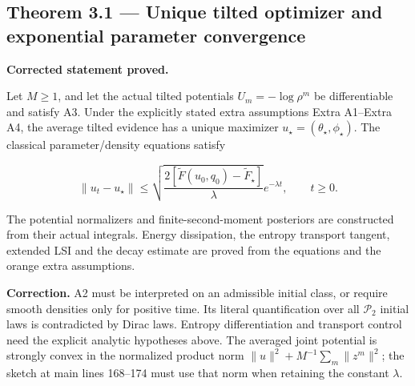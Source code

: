\documentclass[11pt,a4paper]{report}
\begin{document}
\subsection{\texorpdfstring{Theorem 3.1 — Unique tilted optimizer and exponential parameter convergence}{Theorem 3.1 — Unique tilted optimizer and exponential parameter convergence}}


\textbf{Corrected statement proved.}



Let \(M\ge1\), and let the actual tilted potentials \(U_m=-\log\rho^m\) be differentiable and satisfy A3. Under the explicitly stated extra assumptions Extra A1–Extra A4, the average tilted evidence has a unique maximizer \(u_\star=(\theta_\star,\phi_\star)\). The classical parameter/\allowbreak{}density equations satisfy


 \[\|u_t-u_\star\|\le\sqrt{\frac{2[\widetilde F(u_0,q_0)-\widetilde F_\star]}{\lambda}}e^{-\lambda t},\qquad t\ge0.\]


The potential normalizers and finite-second-moment posteriors are constructed from their actual integrals. Energy dissipation, the entropy transport tangent, extended LSI and the decay estimate are proved from the equations and the orange extra assumptions.



\textbf{Correction.} A2 must be interpreted on an admissible initial class,
        or require smooth densities only for positive time. Its literal
        quantification over all \(\mathcal P_2\) initial laws is contradicted by
        Dirac laws. Entropy differentiation and transport control need the
        explicit analytic hypotheses above. The averaged joint potential is
        strongly convex in the normalized product norm
        \(\|u\|^2+M^{-1}\sum_m\|z^m\|^2\); the sketch at main lines 168–174
        must use that norm when retaining the constant \(\lambda\).
\end{document}
